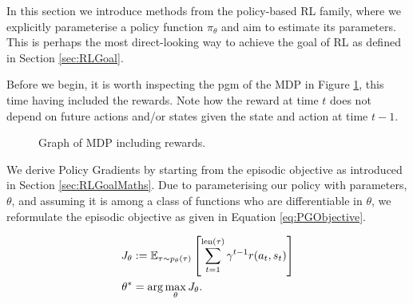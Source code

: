\documentclass{report}
\numberwithin{equation}{section}
\numberwithin{figure}{section}
\numberwithin{table}{section}
\numberwithin{algorithm}{section}
\begin{document}
In this section we introduce methods from 
the policy-based RL family, where we explicitly 
parameterise a policy function 
$\pi_\theta$ and aim to estimate its parameters. This is perhaps 
the most direct-looking way to achieve the goal of RL as defined 
in Section \ref{sec:RLGoal}.

Before we begin, it is worth inspecting the pgm of the MDP
in Figure \ref{fig:MDPRew}, 
this time having included the rewards. Note how the reward 
at time $t$ does not depend on future actions and/or states 
given the state and action at time $t-1$.
\begin{figure}[H]
  \centering
  \caption{\label{fig:MDPRew} Graph of MDP including rewards.}
\end{figure}

We derive Policy Gradients \citep{REINFORCE} 
by starting from the episodic objective as introduced in Section 
\ref{sec:RLGoalMaths}. Due to parameterising our policy 
with parameters, $\theta$, and assuming it is among a 
class of functions who are 
differentiable in $\theta$, we reformulate the episodic 
objective as given in Equation \ref{eq:PGObjective}.

\begin{align}\label{eq:PGObjective}
  J_\theta&:=\mathbb{E}_{\tau\sim p_{\theta}(\tau)}
   \left[
    \sum_{t=1}^{\text{len}(\tau)}\gamma^{t-1}r(a_t, s_t)\right]\notag\\ 
  \theta^*&=\arg \max_{\theta}J_\theta.
\end{align}
\end{document}
